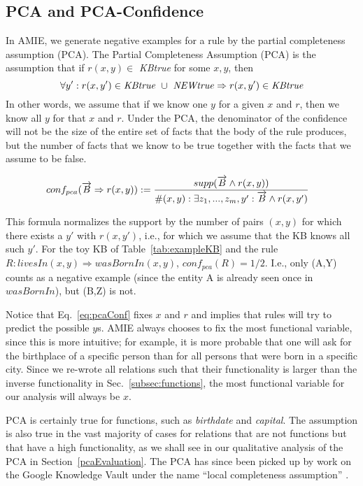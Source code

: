 \subsection{PCA and  PCA-Confidence}\label{subsubsec:pcaConf}



In AMIE, we generate negative examples for a rule by the partial completeness assumption (PCA).
The Partial Completeness Assumption (PCA) is the assumption that if $r(x,y) \in$ \emph{KBtrue} for some $x,y$, then
\[\forall y': r(x,y') \in \mbox{\emph{KBtrue}}\ \cup\ \mbox{\emph{NEWtrue}} \Rightarrow r(x,y') \in \mbox{\emph{KBtrue}}\]
In other words, we assume that if we know one $y$ for a given $x$ and $r$, then we know all $y$ for that $x$ and $r$.
Under the PCA, the denominator of the confidence will not be the size of the entire set of facts that the body of the rule produces,
but the number of facts that we know to be true together with the facts that we assume to be false.

\begin{small}
\begin{equation} \label{eq:pcaConf}
 \hspace*{-2ex}
conf_{pca}(\vec{B} \Rightarrow r(x,y)) := \frac{supp(\vec{B} \wedge r(x,y))}{\#(x,y): \exists z_1,...,z_m,y': \vec{B} \wedge r(x,y')}
\end{equation}
\end{small}

This formula normalizes the support by the number of pairs $(x,y)$ for which there exists a $y'$ with $r(x,y')$,
i.e., for which we assume that the KB knows all such $y'$.
For the toy KB of Table~\ref{tab:exampleKB} and the rule $R: livesIn(x,y)\Rightarrow wasBornIn(x,y)$,
$conf_{pca}(R)=1/2$. I.e., only (A,Y) counts as a negative example (since the entity A is already seen once in $wasBornIn$), but (B,Z) is not.

Notice that Eq.~\ref{eq:pcaConf} fixes $x$ and $r$ and implies that rules will try to predict the possible $y$s. 
AMIE always chooses to fix the most functional variable, since this is more intuitive; for example, 
it is more probable that one will ask for the birthplace of a specific person than for all persons that were born in a specific city.
Since we re-wrote all relations such that their functionality is larger than the inverse functionality in Sec.~\ref{subsec:functions},
the most functional variable for our analysis will always be $x$.

PCA is certainly true for functions, such as \emph{birthdate} and \emph{capital}.
The assumption is also true in the vast majority of cases for relations that are not functions but that have a high functionality,
as we shall see in our qualitative analysis of the PCA in Section~\ref{pcaEvaluation}. 
The PCA has since been picked up by work on the Google Knowledge Vault under the name ``local completeness assumption'' \cite{knowledgevault}.






